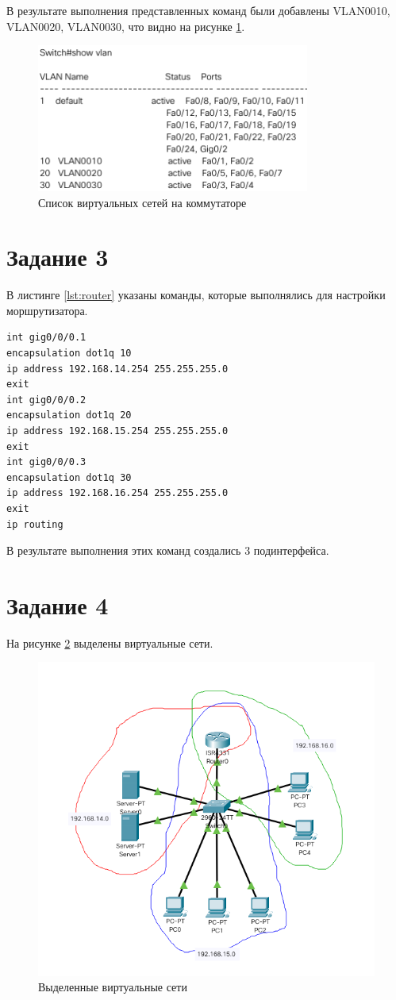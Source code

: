 В результате выполнения представленных команд были добавлены VLAN0010, VLAN0020, VLAN0030, что видно на рисунке \ref{fig:vlan_database}.
\begin{figure}[H]
    \centering
    \includegraphics[width=0.8\textwidth]{images/scr01.png}
    \caption{Список виртуальных сетей на коммутаторе}
    \label{fig:vlan_database}
\end{figure}

\section{Задание 3}
В листинге \ref{lst:router} указаны команды, которые выполнялись для настройки моршрутизатора.
\begin{lstlisting}[frame=single,caption=Команды для настройки маршрутизатора,label=lst:router]
int gig0/0/0.1
encapsulation dot1q 10
ip address 192.168.14.254 255.255.255.0
exit
int gig0/0/0.2
encapsulation dot1q 20
ip address 192.168.15.254 255.255.255.0
exit
int gig0/0/0.3
encapsulation dot1q 30
ip address 192.168.16.254 255.255.255.0
exit
ip routing
\end{lstlisting}

В результате выполнения этих команд создались 3 подинтерфейса.

\section{Задание 4}
На рисунке \ref{fig:virt} выделены виртуальные сети.
\begin{figure}[H]
    \centering
    \includegraphics[width=0.8\linewidth]{images/scr02.png}
    \caption{Выделенные виртуальные сети}%
    \label{fig:virt}
\end{figure}

